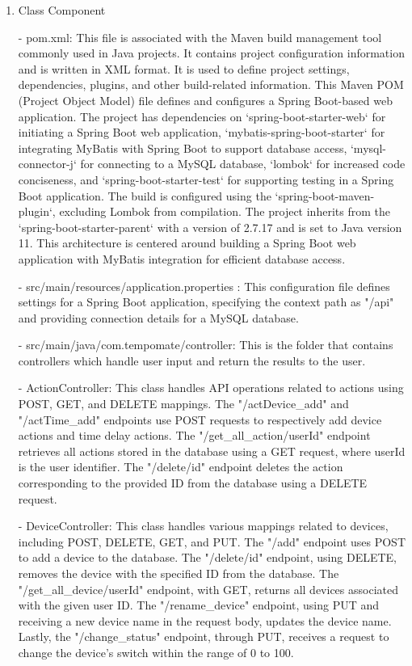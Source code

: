 \begin{enumerate}[label=\arabic*]
\begin{enumerate}[label=\alph*]
\begin{enumerate}
            \item Class Component \\
                \item[-] pom.xml: This file is associated with the Maven build management tool commonly used in Java projects. It contains project configuration information and is written in XML format. It is used to define project settings, dependencies, plugins, and other build-related information. This Maven POM (Project Object Model) file defines and configures a Spring Boot-based web application. The project has dependencies on `spring-boot-starter-web` for initiating a Spring Boot web application, `mybatis-spring-boot-starter` for integrating MyBatis with Spring Boot to support database access, `mysql-connector-j` for connecting to a MySQL database, `lombok` for increased code conciseness, and `spring-boot-starter-test` for supporting testing in a Spring Boot application. The build is configured using the `spring-boot-maven-plugin`, excluding Lombok from compilation. The project inherits from the `spring-boot-starter-parent` with a version of 2.7.17 and is set to Java version 11. This architecture is centered around building a Spring Boot web application with MyBatis integration for efficient database access. \\
                \item[-] src/main/resources/application.properties : This configuration file defines settings for a Spring Boot application, specifying the context path as "/api" and providing connection details for a MySQL database.\\
                \item[-] src/main/java/com.tempomate/controller: This is the folder that contains controllers which handle user input and return the results to the user. \\
                \item[-] ActionController: This class handles API operations related to actions using POST, GET, and DELETE mappings. The "/actDevice\_add" and "/actTime\_add" endpoints use POST requests to respectively add device actions and time delay actions. The "/get\_all\_action/{userId}" endpoint retrieves all actions stored in the database using a GET request, where {userId} is the user identifier. The "/delete/{id}" endpoint deletes the action corresponding to the provided ID from the database using a DELETE request.\\
                \item[-] DeviceController: This class handles various mappings related to devices, including POST, DELETE, GET, and PUT. The "/add" endpoint uses POST to add a device to the database. The "/delete/{id}" endpoint, using DELETE, removes the device with the specified ID from the database. The "/get\_all\_device/{userId}" endpoint, with GET, returns all devices associated with the given user ID. The "/rename\_device" endpoint, using PUT and receiving a new device name in the request body, updates the device name. Lastly, the "/change\_status" endpoint, through PUT, receives a request to change the device's switch within the range of 0 to 100. \\

\end{enumerate}
\end{enumerate}
\end{enumerate}
